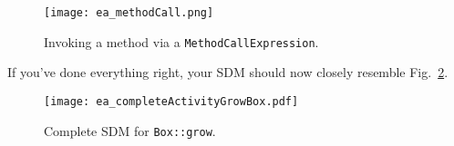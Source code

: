 \begin{figure}[htbp]
\begin{center}
  \texttt{[image: ea\_methodCall.png]}
  \caption{Invoking a method via a \texttt{MethodCallExpression}.}  
  \label{fig:sdm_grow_4} 
\end{center}
\end{figure}
\FloatBarrier

If you've done everything right, your SDM should now closely resemble
Fig.~\ref{fig:sdm_grow_5}.  

\begin{figure}[htbp]
\begin{center}
  \texttt{[image: ea\_completeActivityGrowBox.pdf]}
  \caption{Complete SDM for \texttt{Box::grow}.}  
  \label{fig:sdm_grow_5}
\end{center}
\end{figure}
